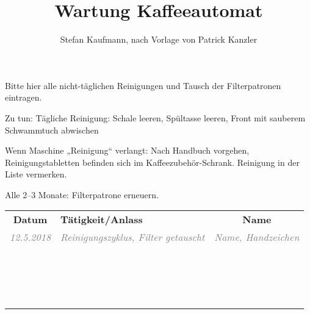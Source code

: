 \documentclass{\basedir/vsh-document}
\title{Wartung Kaffeeautomat}
\author{Stefan Kaufmann, nach Vorlage von Patrick Kanzler}
\newcommand{\thickhline}{\noalign{\hrule height 2pt}}
\begin{document}
Bitte hier alle nicht-täglichen Reinigungen und Tausch der Filterpatronen eintragen.

Zu tun: Tägliche Reinigung: Schale leeren, Spültasse leeren, Front mit sauberem Schwammtuch abwischen

Wenn Maschine „Reinigung“ verlangt: Nach Handbuch vorgehen, Reinigungstabletten befinden sich im Kaffeezubehör-Schrank. Reinigung in der Liste vermerken.

Alle 2–3 Monate: Filterpatrone erneuern.

\newcommand{\bsp}[1]{\textcolor{gray}{\itshape #1}}
\newcommand{\beispielzeile}[5]{\bsp{#2} & \bsp{#3} & \bsp{#4} \\ \hline}
\newcommand{\leerzeile}{\vbox{\vspace{2.4em}} & & \\ \hline}
\vspace{-.4em}
\begin{tabularx}{\textwidth}{|c|X|c|} \hline
\bfseries Datum      &  \bfseries Tätigkeit/Anlass  & \bfseries Name \\\thickhline
\beispielzeile{BSP}{12.5.2018}{ Reinigungszyklus, Filter getauscht }{Name, Handzeichen}
\leerzeile
\leerzeile
\leerzeile
\leerzeile
\leerzeile
\leerzeile
\leerzeile
\leerzeile
\leerzeile
\leerzeile
\leerzeile
\leerzeile
\leerzeile
\leerzeile
\leerzeile
\leerzeile
\leerzeile
\leerzeile
\end{tabularx}
\end{document}
